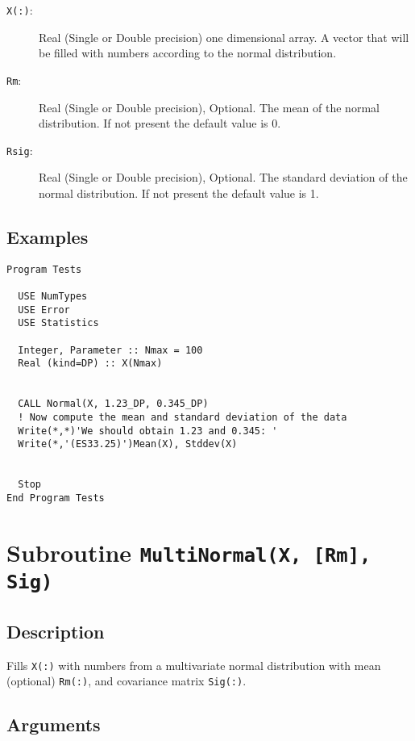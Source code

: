 \begin{description}
\item[\texttt{X(:)}:] Real (Single or Double precision) one
  dimensional array. A vector that will be filled with numbers
  according to the normal distribution.
\item[\texttt{Rm}:] Real (Single or Double precision), Optional. The
  mean of the normal distribution. If not present the default value
  is 0.
\item[\texttt{Rsig}:] Real (Single or Double precision), Optional. The
  standard deviation of the normal distribution.  If not present the
  default value is 1. 
\end{description}

\subsection{Examples}

\begin{lstlisting}[emph=Normal,
                   emphstyle=\color{blue},
                   frame=trBL,
                   caption=Obtaining numbers with a normal distribution.,
                   label=normal]
Program Tests

  USE NumTypes
  USE Error
  USE Statistics

  Integer, Parameter :: Nmax = 100
  Real (kind=DP) :: X(Nmax)


  CALL Normal(X, 1.23_DP, 0.345_DP)
  ! Now compute the mean and standard deviation of the data
  Write(*,*)'We should obtain 1.23 and 0.345: '
  Write(*,'(ES33.25)')Mean(X), Stddev(X)


  Stop
End Program Tests
\end{lstlisting}

\section{Subroutine \texttt{MultiNormal(X, [Rm], Sig)}}

\subsection{Description}

Fills \texttt{X(:)} with numbers from a multivariate normal
distribution with mean (optional) \texttt{Rm(:)}, and covariance matrix
\texttt{Sig(:)}.

\subsection{Arguments}

